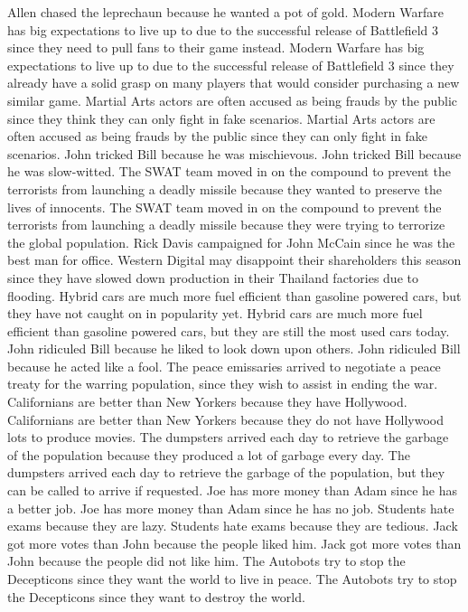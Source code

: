 \documentclass{article}
\begin{document}
\begin{enumerate}
	Allen chased the leprechaun because he wanted a pot of gold.
	Modern Warfare has big expectations to live up to due to the successful release of Battlefield 3 since they need to pull fans to their game instead.
	Modern Warfare has big expectations to live up to due to the successful release of Battlefield 3 since they already have a solid grasp on many players that would consider purchasing a new similar game.
	Martial Arts actors are often accused as being frauds by the public since they think they can only fight in fake scenarios.
	Martial Arts actors are often accused as being frauds by the public since they can only fight in fake scenarios.
	John tricked Bill because he was mischievous.
	John tricked Bill because he was slow-witted.
	The SWAT team moved in on the compound to prevent the terrorists from launching a deadly missile because they wanted to preserve the lives of innocents.
	The SWAT team moved in on the compound to prevent the terrorists from launching a deadly missile because they were trying to terrorize the global population.
	Rick Davis campaigned for John McCain since he was the best man for office.
	Western Digital may disappoint their shareholders this season since they have slowed down production in their Thailand factories due to flooding.
	Hybrid cars are much more fuel efficient than gasoline powered cars, but they have not caught on in popularity yet.
	Hybrid cars are much more fuel efficient than gasoline powered cars, but they are still the most used cars today.
	John ridiculed Bill because he liked to look down upon others.
	John ridiculed Bill because he acted like a fool.
	The peace emissaries arrived to negotiate a peace treaty for the warring population, since they wish to assist in ending the war.
	Californians are better than New Yorkers because they have Hollywood.
	Californians are better than New Yorkers because they do not have Hollywood lots to produce movies.
	The dumpsters arrived each day to retrieve the garbage of the population because they produced a lot of garbage every day.
	The dumpsters arrived each day to retrieve the garbage of the population, but they can be called to arrive if requested.
	Joe has more money than Adam since he has a better job.
	Joe has more money than Adam since he has no job.
	Students hate exams because they are lazy.
	Students hate exams because they are tedious.
	Jack got more votes than John because the people liked him.
	Jack got more votes than John because the people did not like him.
	The Autobots try to stop the Decepticons since they want the world to live in peace.
	The Autobots try to stop the Decepticons since they want to destroy the world.

\end{enumerate}
\end{document}
